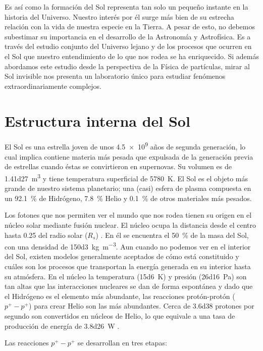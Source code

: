 Es así como la formación del Sol representa tan solo un pequeño instante en la historia del Universo. Nuestro interés por él surge más bien de su estrecha relación con la vida de nuestra especie en la Tierra. A pesar de esto, no debemos subestimar su importancia en el desarrollo de la Astronomía y Astrofísica. Es a través del estudio conjunto del Universo lejano y de los procesos que ocurren en el Sol que nuestro entendimiento de lo que nos rodea se ha enriquecido. Si además abordamos este estudio desde la perspectiva de la Física de partículas, mirar al Sol invisible nos presenta un laboratorio único para estudiar fenómenos extraordinariamente complejos.

\section{Estructura interna del Sol}

El Sol es una estrella joven de unos \num{4.5e9} años de segunda generación, lo cual implica contiene materia más pesada que expulsada de la generación previa de estrellas cuando éstas se convirtieron en supernovas. Su volumen es de \SI{1.41d27}{\cubic\metre} y tiene temperatura superficial de \SI{5780}{\kelvin}. El Sol es el objeto más grande de nuestro sistema planetario; una (casi) esfera de plasma compuesta en un \SI{92.1}{\percent} de Hidrógeno, \SI{7.8}{\percent} Helio y \SI{0.1}{\percent} de otros materiales más pesados.

Los fotones que nos permiten ver el mundo que nos rodea tienen su origen en el núcleo solar mediante fusión nuclear. El núcleo ocupa la distancia desde el centro hasta \num{0.25} del radio solar ($R_{s}$) \cite{fisica13}. En él se encuentra el \SI{50}{\percent} de la masa del Sol, con una densidad de \SI{150d3}{\kilogram\per\cubic\metre}. Aun cuando no podemos ver en el interior del Sol, existen modelos generalmente aceptados de cómo está constituido y cuáles son los procesos que transportan la energía generada en su interior hasta su atmósfera. En el núcleo la temperatura (\SI{15d6}{\kelvin}) y presión (\SI{26d16}{\pascal}) son tan altas que las interacciones nucleares se dan de forma espontánea y dado que el Hidrógeno es el elemento más abundante, las reacciones protón-protón ($p^{+}-p^{+}$) para crear Helio son las más abundantes. Cerca de \num{3.6d38} protones por segundo son convertidos en núcleos de Helio, lo que equivale a una tasa de producción de energía de \SI{3.8d26}{\watt} \cite{lang09}.

Las reacciones $p^{+}-p^{+}$ se desarrollan en tres etapas:

